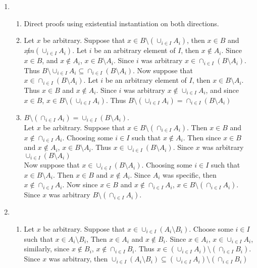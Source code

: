 \begin{enumerate}
    \item
    \begin{enumerate}
        \item Direct proofs using existential instantiation on both directions.
        \item 
    Let $x$ be arbitrary. Suppose that $x \in B \setminus (\cup_{i \in I} A_i)$, then $x \in B$ and $x \not in (\cup_{i \in I} A_i)$. Let $i$ be an arbitrary element of $I$, then $x \not \in A_i$. Since $x \in B$, and $x \not \in A_i$, $x \in B \setminus A_i$. Since $i$ was arbitrary $x \in \cap_{i \in I} (B \setminus A_i)$. Thus $B \setminus \cup_{i \in I} A_i \subseteq \cap_{i \in I} (B \setminus A_i)$.
    Now suppose that $x \in \cap_{i \in I} (B \setminus A_i)$. Let $i$ be an arbitrary element of $I$, then $x \in B \setminus A_i$. Thus $x \in B$ and $x \not \in A_i$. Since $i$ was arbitrary $x \not \in \cup_{i \in I} A_i$, and since $x \in B$, $x \in B \setminus (\cup_{i \in I} A_i)$. Thus $B \setminus (\cup_{i \in I} A_i) = \cap_{i \in I} (B \setminus A_i)$
        \item 
    $B \setminus (\cap_{i \in I} A_i) = \cup_{i \in I} (B \setminus A_i)$.\\
    Let $x$ be arbitrary. Suppose that $x \in B \setminus (\cap_{i \in I} A_i)$. Then $x \in B$ and $x \not \in \cap_{i \in I} A_i$. Choosing some $i \in I$ such that $x \not \in A_i$. Then since $x \in B$ and $x \not \in A_i$, $x \in B \setminus A_i$. Thus $x \in \cup_{i \in I} (B \setminus A_i)$. Since $x$ was arbitrary $\cup_{i \in I} (B \setminus A_i)$ \\
    Now suppose that $x \in \cup_{i \in I}(B \setminus A_i)$. Choosing some $i \in I$ such that $x \in B \setminus A_i$. Then $x \in B$ and $x \not \in A_i$. Since $A_i$ was specific, then $x \not \in \cap_{i \in I} A_i$. Now since $x \in B$ and $x \not \in \cap_{i \in I} A_i$, $x \in B \setminus (\cap_{i \in I} A_i)$. Since $x$ was arbitrary $B \setminus (\cap_{i \in I} A_i)$.
    \end{enumerate}
    \item
    \begin{enumerate}
        \item 
    Let $x$ be arbitrary. Suppose that $x \in \cup_{i \in I}(A_i \setminus B_i)$. Choose some $i \in I$ such that $x \in A_i \setminus B_i$, Then $x \in A_i$ and $x \not \in B_i$.
    Since $x \in A_i$, $x \in \cup_{i \in I} A_i$, similarly, since $x \not \in B_i$, $x \not \in \cap_{i \in I} B_i$. Thus $x \in (\cup_{i \in I} A_i) \setminus (\cap_{i \in I} B_i)$. Since $x$ was arbitrary, then $\cup_{i \in I}(A_i \setminus B_i) \subseteq (\cup_{i \in I} A_i) \setminus (\cap_{i \in I} B_i)$

\end{enumerate}
\end{enumerate}
